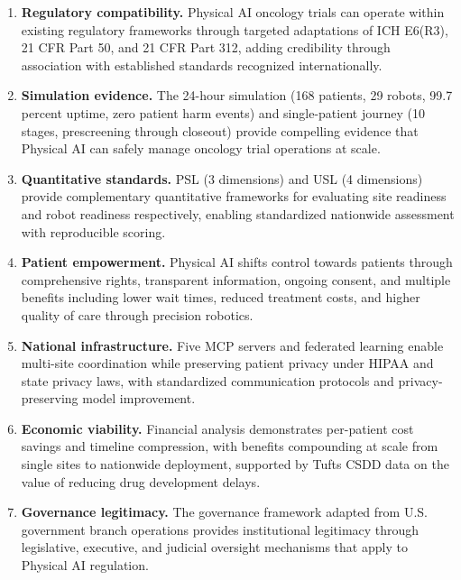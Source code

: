 \begin{enumerate}[nosep]
  \item \textbf{Regulatory compatibility.} Physical AI oncology trials can
    operate within existing regulatory frameworks through targeted adaptations
    of ICH E6(R3), 21 CFR Part 50, and 21 CFR Part 312, adding credibility
    through association with established standards recognized internationally.

  \item \textbf{Simulation evidence.} The 24-hour simulation (168 patients, 29
    robots, 99.7 percent uptime, zero patient harm events) and single-patient
    journey (10 stages, prescreening through closeout) provide compelling
    evidence that Physical AI can safely manage oncology trial operations at
    scale.

  \item \textbf{Quantitative standards.} PSL (3 dimensions) and USL (4
    dimensions) provide complementary quantitative frameworks for evaluating
    site readiness and robot readiness respectively, enabling standardized
    nationwide assessment with reproducible scoring.

  \item \textbf{Patient empowerment.} Physical AI shifts control towards
    patients through comprehensive rights, transparent information, ongoing
    consent, and multiple benefits including lower wait times, reduced treatment
    costs, and higher quality of care through precision robotics.

  \item \textbf{National infrastructure.} Five MCP servers and federated
    learning enable multi-site coordination while preserving patient privacy
    under HIPAA and state privacy laws, with standardized communication
    protocols and privacy-preserving model improvement.

  \item \textbf{Economic viability.} Financial analysis demonstrates
    per-patient cost savings and timeline compression, with benefits compounding
    at scale from single sites to nationwide deployment, supported by Tufts
    CSDD data on the value of reducing drug development delays.

  \item \textbf{Governance legitimacy.} The governance framework adapted from
    U.S. government branch operations provides institutional legitimacy through
    legislative, executive, and judicial oversight mechanisms that apply to
    Physical AI regulation.
\end{enumerate}


